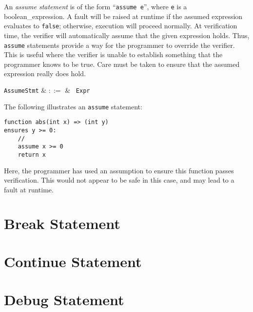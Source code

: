 An {\em assume statement} is of the form ``\lstinline{assume e}'', where \lstinline{e} is a \gls{boolean_expression}.  A \gls{fault} will be raised at runtime if the assumed expression evaluates to \lstinline{false}; otherwise, execution will proceed normally.  At verification time, the verifier will automatically assume that the given expression holds.  Thus, \lstinline{assume} statements provide a way for the programmer to override the verifier.  This is useful where the verifier is unable to establish something that the programmer knows to be true.  Care must be taken to ensure that the assumed expression really does hold.

\begin{syntax}
  \verb+AssumeStmt+ & $::=$ & \ \verb+Expr+\\
\end{syntax}

\noindent The following illustrates an \lstinline{assume} statement:

\begin{lstlisting}
function abs(int x) => (int y)
ensures y >= 0:
    //
    assume x >= 0
    return x
\end{lstlisting}
Here, the programmer has used an assumption to ensure this function passes verification.  This would not appear to be safe in this case, and may lead to a fault at runtime.


\section{Break Statement}
\label{c_stmts_break}


\section{Continue Statement}
\label{c_stmts_continue}


\section{Debug Statement}

